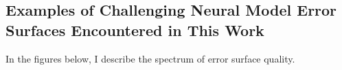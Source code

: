 \subsection{Examples of Challenging Neural Model Error Surfaces Encountered in This Work}
In the figures below, I describe the spectrum of error surface quality.

